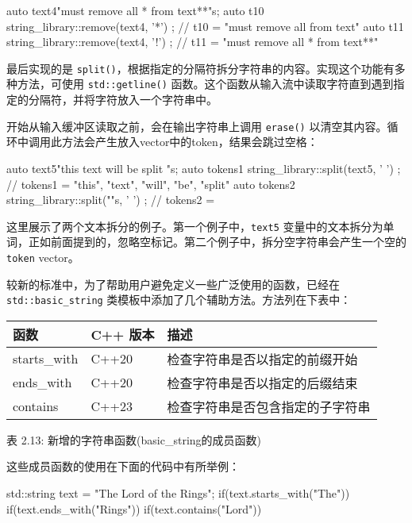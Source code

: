 \begin{cpp}
auto text4{"must remove all * from text**"s};
auto t10{ string_library::remove(text4, '*') };
// t10 = "must remove all  from text"
auto t11{ string_library::remove(text4, '!') };
// t11 = "must remove all * from text**"
\end{cpp}

最后实现的是 \verb|split()|，根据指定的分隔符拆分字符串的内容。实现这个功能有多种方法，可使用 \verb|std::getline()| 函数。这个函数从输入流中读取字符直到遇到指定的分隔符，并将字符放入一个字符串中。

开始从输入缓冲区读取之前，会在输出字符串上调用 \verb|erase()| 以清空其内容。循环中调用此方法会产生放入vector中的token，结果会跳过空格：

\begin{cpp}
auto text5{"this text will be split   "s};
auto tokens1{ string_library::split(text5, ' ') };
// tokens1 = {"this", "text", "will", "be", "split"}
auto tokens2{ string_library::split(""s, ' ') };
// tokens2 = {}
\end{cpp}

这里展示了两个文本拆分的例子。第一个例子中，\verb|text5| 变量中的文本拆分为单词，正如前面提到的，忽略空标记。第二个例子中，拆分空字符串会产生一个空的 \verb|token| vector。


较新的标准中，为了帮助用户避免定义一些广泛使用的函数，已经在 \verb|std::basic_string| 类模板中添加了几个辅助方法。方法列在下表中：

\begin{longtable}{|l|l|l|}
\hline
\textbf{函数} & \textbf{C++ 版本} & \textbf{描述}                                       \\ \hline
\endfirsthead
%
\endhead
%
starts\_with      & C++20                & 检查字符串是否以指定的前缀开始 \\ \hline
ends\_with        & C++20                & 检查字符串是否以指定的后缀结束   \\ \hline
contains          & C++23                & 检查字符串是否包含指定的子字符串 \\ \hline
\end{longtable}

\begin{center}
表 2.13: 新增的字符串函数(basic\_string的成员函数)
\end{center}

这些成员函数的使用在下面的代码中有所举例：

\begin{cpp}
std::string text = "The Lord of the Rings";
if(text.starts_with("The")) {}
if(text.ends_with("Rings")) {}
if(text.contains("Lord")) {}
\end{cpp}

